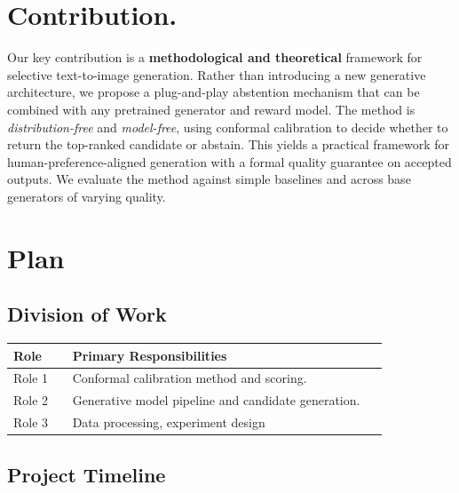 \documentclass[twocolumn,11pt]{article}
\theoremstyle{plain}
\theoremstyle{definition}
\theoremstyle{remark}
\begin{document}



\section{Contribution.}
Our key contribution is a \textbf{methodological and theoretical} framework for selective text-to-image generation. Rather than introducing a new generative architecture, we propose a plug-and-play abstention mechanism that can be combined with any pretrained generator and reward model. The method is \textit{distribution-free} and \textit{model-free}, using conformal calibration to decide whether to return the top-ranked candidate or abstain. This yields a practical framework for human-preference-aligned generation with a formal quality guarantee on accepted outputs. We evaluate the method against simple baselines and across base generators of varying quality.

\section{Plan}

\subsection{Division of Work}

\begin{center}
\begin{tabular}{p{0.15\linewidth}p{0.8\linewidth}}
\toprule
\textbf{Role} & \textbf{Primary Responsibilities} \\
\midrule
Role 1 & Conformal calibration method and scoring. \\
Role 2 & Generative model pipeline and candidate generation. \\
Role 3 & Data processing, experiment design \\
\bottomrule
\end{tabular}
\end{center}

\subsection{Project Timeline}
\end{document}
